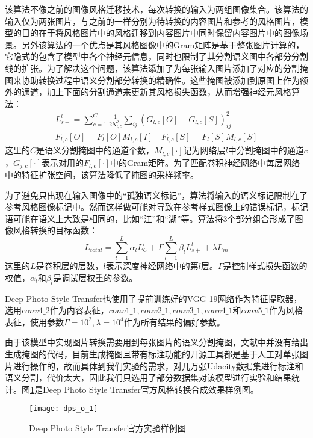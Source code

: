 该算法不像之前的图像风格迁移技术，每次转换的输入为两组图像集合。该算法的输入仅为两张图片，与之前的一样分别为待转换的内容图片和参考的风格图片，模型的目的在于将风格图片中的风格迁移到内容图片中同时保留内容图片中的图像场景。另外该算法的一个优点是其风格图像中的Gram矩阵是基于整张图片计算的，它隐式的包含了模型中各个神经元信息，同时也限制了其分割语义图中各部分分割线的扩张。为了解决这个问题，该算法添加了为每张输入图片添加了对应的分割掩图来协助转换过程中语义分割部分转换的精确性。这些掩图被添加到原图上作为额外的通道，加上下面的分割通道来更新其风格损失函数，从而增强神经元风格算法：
\begin{gather*}
L_{s+}^l=\sum_{c=1}^C \frac{1}{2N_{l,c}^2}\sum_{ij}(G_{l,c}[O]-G_{l,c}[S])_{ij}^2\\
F_{l,c}[O]=F_l[O]M_{l,c}[I]\quad F_{l,c}[S]=F_l[S]M_{l,c}[S]
\end{gather*}
这里的$C$是语义分割掩图中的通道个数，$M_{l,c}[\cdot]$记为网络层$l$中分割掩图中的通道$c$，$G_{j,c}[\cdot]$表示对用的$F_{l,c}[\cdot]$中的Gram矩阵。为了匹配卷积神经网络中每层网络中的特征扩张空间，该算法降低了掩图的采样频率。

为了避免只出现在输入图像中的“孤独语义标记”，算法将输入的语义标记限制在了参考风格图像标记中。然而这样做可能对导致在参考样式图像上的错误标记，标记语可能在语义上大致是相同的，比如“江”和“湖”等。算法将3个部分组合形成了图像风格转换的目标函数：
$$L_{total}=\sum_{t=1}^L\alpha_lL_C^l+\Gamma\sum_{l=1}^L \beta_lL_{s+}^l +\lambda L_m$$
这里的$L$是卷积层的层数，$l$表示深度神经网络中的第$l$层。$\Gamma$是控制样式损失函数的权值，$\alpha_l$和$\beta_l$是调试层权重的参数。

Deep Photo Style Transfer也使用了提前训练好的VGG-19\cite{vgg-19}网络作为特征提取器，选用$conv4\_2$作为内容表征，$conv1\_1,conv2\_1,conv3\_1,conv4\_1$和$conv5\_1$作为风格表征，使用参数$\Gamma=10^2,\lambda=10^4$作为所有结果的偏好参数。

由于该模型中实现图片转换需要用到每张图片的语义分割掩图，文献\cite{dpst}中并没有给出生成掩图的代码，目前生成掩图且带有标注功能的开源工具都是基于人工对单张图片进行操作的，故而具体到我们实验的需求，对几万张Udacity数据集进行标注和语义分割，代价太大，因此我们只选用了部分数据集对该模型进行实验和结果统计。图\ref{fig:dps}是Deep Photo Style Transfer官方风格转换合成效果样例图。

\begin{figure}[h]
    \centering
    \texttt{[image: dps\_o\_1]}
    \caption{Deep Photo Style Transfer官方实验样例图}
    \label{fig:dps}
\end{figure}

